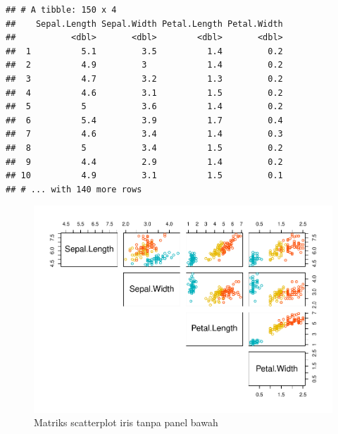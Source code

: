 \documentclass[]{book}
\newenvironment{Shaded}{\begin{snugshade}}{\end{snugshade}}
\newcommand{\KeywordTok}[1]{\textcolor[rgb]{0.13,0.29,0.53}{\textbf{#1}}}
\newcommand{\DataTypeTok}[1]{\textcolor[rgb]{0.13,0.29,0.53}{#1}}
\newcommand{\StringTok}[1]{\textcolor[rgb]{0.31,0.60,0.02}{#1}}
\newcommand{\CommentTok}[1]{\textcolor[rgb]{0.56,0.35,0.01}{\textit{#1}}}
\newcommand{\OtherTok}[1]{\textcolor[rgb]{0.56,0.35,0.01}{#1}}
\newcommand{\OperatorTok}[1]{\textcolor[rgb]{0.81,0.36,0.00}{\textbf{#1}}}
\newcommand{\NormalTok}[1]{#1}
\begin{document}
\begin{verbatim}
## # A tibble: 150 x 4
##    Sepal.Length Sepal.Width Petal.Length Petal.Width
##           <dbl>       <dbl>        <dbl>       <dbl>
##  1          5.1         3.5          1.4         0.2
##  2          4.9         3            1.4         0.2
##  3          4.7         3.2          1.3         0.2
##  4          4.6         3.1          1.5         0.2
##  5          5           3.6          1.4         0.2
##  6          5.4         3.9          1.7         0.4
##  7          4.6         3.4          1.4         0.3
##  8          5           3.4          1.5         0.2
##  9          4.4         2.9          1.4         0.2
## 10          4.9         3.1          1.5         0.1
## # ... with 140 more rows
\end{verbatim}

\begin{Shaded}
\end{Shaded}

\begin{figure}

{\centering \includegraphics[width=0.8\linewidth]{EnvStat_files/figure-latex/matscat3-1} 

}

\caption{Matriks scatterplot iris tanpa panel bawah}\label{fig:matscat3}
\end{figure}
\end{document}
